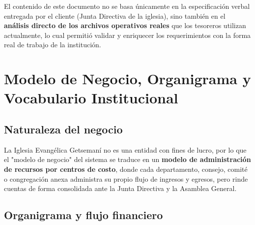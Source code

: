 \documentclass[11pt,a4paper]{article}
\begin{document}
	El contenido de este documento no se basa únicamente en la especificación verbal entregada por el cliente (Junta Directiva de la iglesia), sino también en el \textbf{análisis directo de los archivos operativos reales} que los tesoreros utilizan actualmente, lo cual permitió validar y enriquecer los requerimientos con la forma real de trabajo de la institución.
	
	\section{Modelo de Negocio, Organigrama y Vocabulario Institucional}
	
	\subsection{Naturaleza del negocio}
	La Iglesia Evangélica Getsemaní no es una entidad con fines de lucro, por lo que el "modelo de negocio" del sistema se traduce en un \textbf{modelo de administración de recursos por centros de costo}, donde cada departamento, consejo, comité o congregación anexa administra su propio flujo de ingresos y egresos, pero rinde cuentas de forma consolidada ante la Junta Directiva y la Asamblea General.
	
	\subsection{Organigrama y flujo financiero}
	
\end{document}

